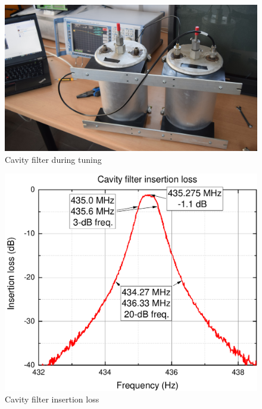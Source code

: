 \begin{figure}
    \centering
    \includegraphics[width=0.5\paperwidth]{img/7/cavity_filter_during_tuning.jpg}
    \caption{Cavity filter during tuning}
    \label{cavity_filter_during_tuning}
\end{figure}

\begin{figure}
    \centering
    \includegraphics[width=0.5\paperwidth]{img/7/FilterLossG.pdf}
    \caption{Cavity filter insertion loss}
    \label{cavity_filter_insertion_loss}
\end{figure}

